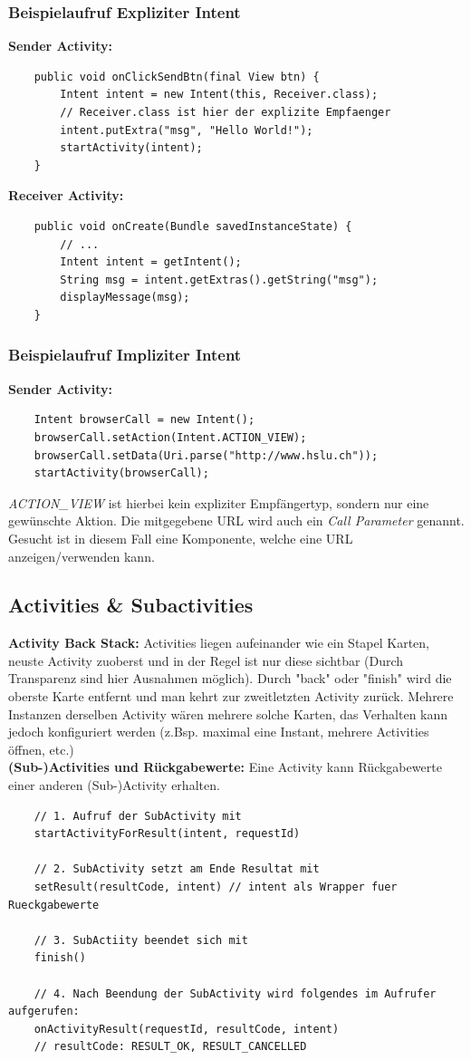 \documentclass[a4paper]{article}
\begin{document}
	\subsubsection{Beispielaufruf Expliziter Intent}
	\textbf{Sender Activity:}
	\begin{lstlisting}
	public void onClickSendBtn(final View btn) {
		Intent intent = new Intent(this, Receiver.class); 
		// Receiver.class ist hier der explizite Empfaenger
		intent.putExtra("msg", "Hello World!");
		startActivity(intent);
	}
	\end{lstlisting}
	\textbf{Receiver Activity:}
	\begin{lstlisting}
	public void onCreate(Bundle savedInstanceState) {
		// ...
		Intent intent = getIntent();
		String msg = intent.getExtras().getString("msg");
		displayMessage(msg);
	}
	\end{lstlisting}
	
	\newpage
	
	\subsubsection{Beispielaufruf Impliziter Intent}
	\textbf{Sender Activity:}
	\begin{lstlisting}
	Intent browserCall = new Intent();
	browserCall.setAction(Intent.ACTION_VIEW);
	browserCall.setData(Uri.parse("http://www.hslu.ch"));
	startActivity(browserCall);	
	\end{lstlisting}
	\textit{ACTION\_VIEW} ist hierbei kein expliziter Empfängertyp, sondern nur eine gewünschte Aktion. Die mitgege\-bene URL wird auch ein \textit{Call Parameter} genannt. Gesucht ist in diesem Fall eine Komponente, welche eine URL anzeigen/verwenden kann.\\
	\subsection{Activities \& Subactivities}
	\textbf{Activity Back Stack:} Activities liegen aufeinander wie ein Stapel Karten, neuste Activity zuoberst und in der Regel ist nur diese sichtbar (Durch Transparenz sind hier Ausnahmen möglich).
	Durch "back" oder "finish" wird die oberste Karte entfernt und man kehrt zur zweitletzten Activity zurück. Mehrere Instanzen derselben Activity wären mehrere solche Karten, das Verhalten kann jedoch konfiguriert werden (z.Bsp. maximal eine Instant, mehrere Activities öffnen, etc.)\\
	\textbf{(Sub-)Activities und Rückgabewerte:} Eine Activity kann Rückgabewerte einer anderen (Sub-)Activity erhalten.
	\begin{lstlisting}
	// 1. Aufruf der SubActivity mit
	startActivityForResult(intent, requestId)
	
	// 2. SubActivity setzt am Ende Resultat mit
	setResult(resultCode, intent) // intent als Wrapper fuer Rueckgabewerte
	
	// 3. SubActiity beendet sich mit
	finish()
	
	// 4. Nach Beendung der SubActivity wird folgendes im Aufrufer aufgerufen:
	onActivityResult(requestId, resultCode, intent)
	// resultCode: RESULT_OK, RESULT_CANCELLED
	\end{lstlisting}
\end{document}
